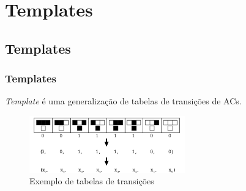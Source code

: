 \documentclass[aspectratio=43,hyperref={pdfpagelabels=false}]{beamer}
\begin{document}









\section{Templates}
\subsection*{Templates}
\begin{frame}
	\frametitle{Templates}
	
	\textit{Template} é uma generalização de tabelas de transições de ACs.
    \begin{figure}[h!]
        \centering
        \includegraphics[width=0.6\textwidth]{fig_transitionTable.pdf}
        \caption{Exemplo de tabelas de transições}
    \end{figure}
\end{frame}
\end{document}
